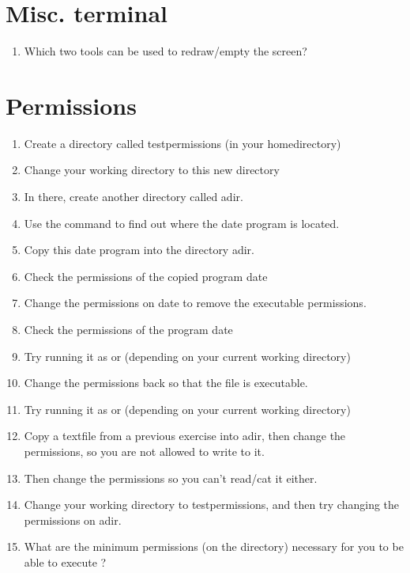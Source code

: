 \documentclass[a4paper,11pt,english]{sphinxmanual}
\begin{document}
\section{Misc. terminal}
\label{exercises/exercises_beginner:misc-terminal}\begin{enumerate}
\item {} 
Which two tools can be used to redraw/empty the screen?

\end{enumerate}


\section{Permissions}
\label{exercises/exercises_beginner:permissions}\begin{enumerate}
\item {} 
Create a directory called testpermissions (in your homedirectory)

\item {} 
Change your working directory to this new directory

\item {} 
In there, create another directory called adir.

\item {} 
Use the command  to find out where the date program is located.

\item {} 
Copy this date program into the directory adir.

\item {} 
Check the permissions of the copied program date

\item {} 
Change the permissions on date to remove the executable permissions.

\item {} 
Check the permissions of the program date

\item {} 
Try running it as  or  (depending on your current working directory)

\item {} 
Change the permissions back so that the file is executable.

\item {} 
Try running it as  or  (depending on your current working directory)

\item {} 
Copy a textfile from a previous exercise into adir, then change the permissions, so you are not allowed to write to it.

\item {} 
Then change the permissions so you can't read/cat it either.

\item {} 
Change your working directory to testpermissions, and then try changing the permissions on adir.

\item {} 
What are the minimum permissions (on the directory) necessary for you to be able to execute ?

\end{enumerate}
\end{document}
